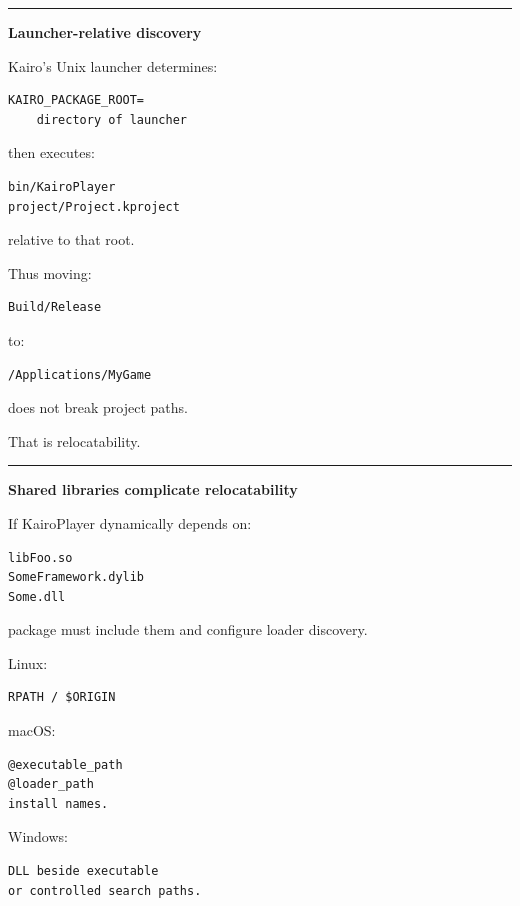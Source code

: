 \begin{center}\rule{0.5\linewidth}{0.5pt}\end{center}

\textbf{Launcher-relative discovery}

Kairo's Unix launcher determines:

\begin{verbatim}
KAIRO_PACKAGE_ROOT=
    directory of launcher
\end{verbatim}

then executes:

\begin{verbatim}
bin/KairoPlayer
project/Project.kproject
\end{verbatim}

relative to that root.

Thus moving:

\begin{verbatim}
Build/Release
\end{verbatim}

to:

\begin{verbatim}
/Applications/MyGame
\end{verbatim}

does not break project paths.

That is relocatability.

\begin{center}\rule{0.5\linewidth}{0.5pt}\end{center}

\textbf{Shared libraries complicate relocatability}

If KairoPlayer dynamically depends on:

\begin{verbatim}
libFoo.so
SomeFramework.dylib
Some.dll
\end{verbatim}

package must include them and configure loader discovery.

Linux:

\begin{verbatim}
RPATH / $ORIGIN
\end{verbatim}

macOS:

\begin{verbatim}
@executable_path
@loader_path
install names.
\end{verbatim}

Windows:

\begin{verbatim}
DLL beside executable
or controlled search paths.
\end{verbatim}

